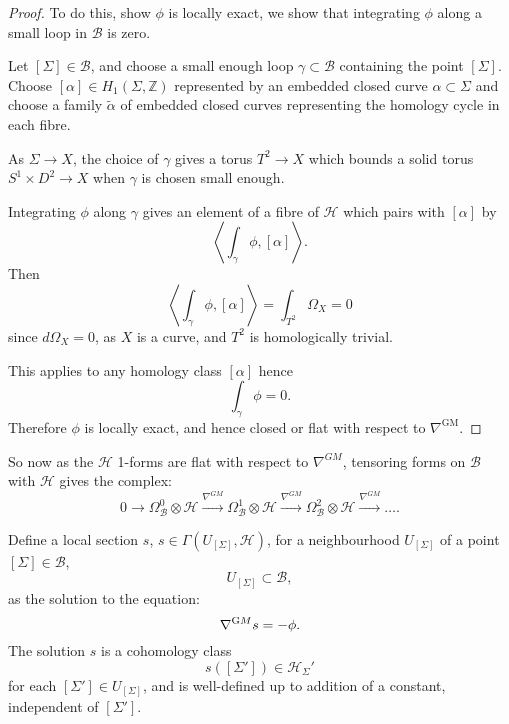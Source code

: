     \begin{proof}
    To do this, show \( \phi \) is locally exact, we show that integrating \( \phi \) along a small loop in \( \mathcal{B}\) is zero.
    
     Let \([\Sigma]\in\mathcal{B}\), and choose a small enough loop \( \gamma \subset \mathcal{B}\) containing the point \([\Sigma]\).  Choose \([\alpha]\in H_1(\Sigma,\mathbb{Z}) \) represented by an embedded closed curve \(\alpha\subset\Sigma\) and choose a family \(\widetilde{\alpha}\) of embedded closed curves representing the homology cycle in each fibre.  
     
     As \( \Sigma \rightarrow X\), the choice of \( \gamma\) gives a torus \(T^2\rightarrow X\) which bounds a solid torus \(S^1 \times D^2 \rightarrow X\) when \(\gamma\) is chosen small enough.  
     
    Integrating \(\phi\) along \(\gamma\) gives an element of a fibre of \(\mathcal{H}\) which pairs with \([\alpha]\) by
    \[\left\langle\int_\gamma\phi,[\alpha]\right\rangle. \]
    Then 
    \[ \left\langle\int_\gamma\phi,[\alpha]\right\rangle  = \int_{T^2}\Omega_X=0\]
    since \(d\Omega_X=0\), as \(X\) is a curve, and \(T^2\) is homologically trivial.  
    
    This applies to any homology class \([\alpha]\) hence 
    \[ \int_\gamma\phi=0.\]
    Therefore \(\phi\) is locally exact, and hence closed or flat with respect to \(\nabla^{\mathrm{GM}}\).
    \end{proof}
    
    
    So now as the \( \mathcal{H}\) 1-forms are flat with respect to \( \nabla^{GM}\), tensoring forms on \( \mathcal{B}\) with \( \mathcal{H}\) gives the complex:
    \[ 0 \longrightarrow \Omega^0_\mathcal{B} \otimes{\mathcal{H}} \stackrel{\nabla^{GM}}{\longrightarrow} \Omega^1_\mathcal{B} \otimes {\mathcal{H}} \stackrel{\nabla^{GM}}{\longrightarrow } \Omega^2_\mathcal{B} \otimes{\mathcal{H}} \stackrel{\nabla^{GM}}{\longrightarrow} \dots. \]
 
    Define a local section \(s\), \(s\in\Gamma(U_{[\Sigma]},\mathcal{H} )\), for a neighbourhood \(U_{[\Sigma]}\)  of a point \([\Sigma]\in \mathcal{B} \),
    \[ U_{[\Sigma]}\subset \mathcal{B},  \] 
    as the solution to the equation:
    \[ \nabla^{\text GM}s = -\phi.\]  
    The solution \(s\) is a cohomology class \[ s([\Sigma'])\in \mathcal{H}_\Sigma' \] for each \( [\Sigma']\in U_{[\Sigma]}\), and is well-defined up to addition of a constant,  independent of \([\Sigma']\). 
    
